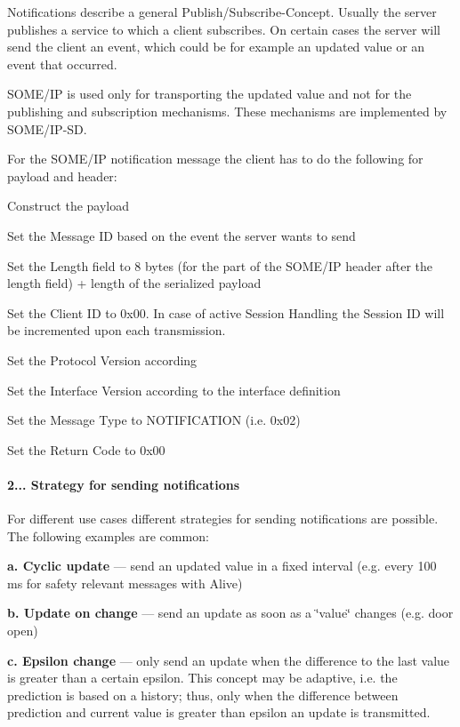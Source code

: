 \begin{DoxyItemize}
\item Notifications describe a general Publish/\+Subscribe-\/\+Concept. Usually the server publishes a service to which a client subscribes. On certain cases the server will send the client an event, which could be for example an updated value or an event that occurred. 
\item S\+O\+M\+E/\+IP is used only for transporting the updated value and not for the publishing and subscription mechanisms. These mechanisms are implemented by S\+O\+M\+E/\+I\+P-\/\+SD.
\item For the S\+O\+M\+E/\+IP notification message the client has to do the following for payload and header\+:
\begin{DoxyItemize}
\item Construct the payload
\item Set the Message ID based on the event the server wants to send
\item Set the Length field to 8 bytes (for the part of the S\+O\+M\+E/\+IP header after the length field) + length of the serialized payload
\item Set the Client ID to 0x00. In case of active Session Handling the Session ID will be incremented upon each transmission.
\item Set the Protocol Version according
\item Set the Interface Version according to the interface definition
\item Set the Message Type to N\+O\+T\+I\+F\+I\+C\+A\+T\+I\+ON (i.\+e. 0x02)
\item Set the Return Code to 0x00
\end{DoxyItemize}
\end{DoxyItemize}

\paragraph*{2... Strategy for sending notifications}


\begin{DoxyItemize}
\item For different use cases different strategies for sending notifications are possible. The following examples are common\+:

{\bfseries a. Cyclic update} — send an updated value in a fixed interval (e.\+g. every 100 ms for safety relevant messages with Alive)

{\bfseries b. Update on change} — send an update as soon as a \char`\"{}value\char`\"{} changes (e.\+g. door open)

{\bfseries c. Epsilon change} — only send an update when the difference to the last value is greater than a certain epsilon. This concept may be adaptive, i.\+e. the prediction is based on a history; thus, only when the difference between prediction and current value is greater than epsilon an update is transmitted.
\end{DoxyItemize}

